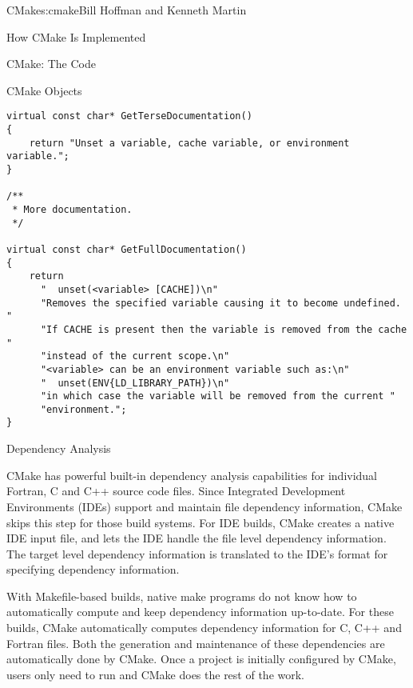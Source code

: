 \begin{aosachapter}{CMake}{s:cmake}{Bill Hoffman and Kenneth Martin}
\begin{aosasect1}{How CMake Is Implemented}
\begin{aosasect2}{CMake: The Code}
\begin{aosasect3}{CMake Objects}
\pagebreak

\begin{verbatim}
virtual const char* GetTerseDocumentation()
{
    return "Unset a variable, cache variable, or environment variable.";
}

/**
 * More documentation.
 */

virtual const char* GetFullDocumentation()
{
    return
      "  unset(<variable> [CACHE])\n"
      "Removes the specified variable causing it to become undefined.  "
      "If CACHE is present then the variable is removed from the cache "
      "instead of the current scope.\n"
      "<variable> can be an environment variable such as:\n"
      "  unset(ENV{LD_LIBRARY_PATH})\n"
      "in which case the variable will be removed from the current "
      "environment.";
}
\end{verbatim}

\end{aosasect3}

\begin{aosasect3}{Dependency Analysis}

CMake has powerful built-in dependency analysis capabilities for
individual Fortran, C and C++ source code files. Since Integrated
Development Environments (IDEs) support and maintain file dependency
information, CMake skips this step for those build systems. For IDE
builds, CMake creates a native IDE input file, and lets the IDE handle
the file level dependency information. The target level dependency information
is translated to the IDE's format for specifying dependency information.

With Makefile-based builds, native make programs do not know how to
automatically compute and keep dependency information up-to-date. For
these builds, CMake automatically computes dependency information for
C, C++ and Fortran files. Both the generation and maintenance of these
dependencies are automatically done by CMake. Once a project is
initially configured by CMake, users only need to run  and
CMake does the rest of the work.


\end{aosasect3}
\end{aosasect2}
\end{aosasect1}
\end{aosachapter}
